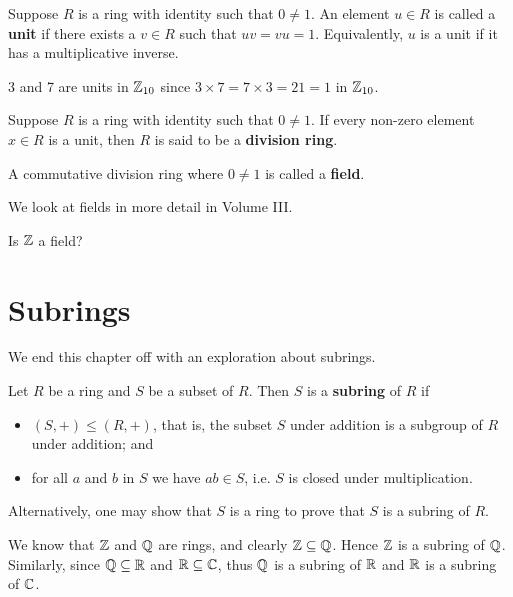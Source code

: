 \begin{definition}
    Suppose $R$ is a ring with identity such that $0 \neq 1$. An element $u \in R$ is called a \textbf{unit} if there exists a $v \in R$ such that $uv=vu=1$. Equivalently, $u$ is a unit if it has a multiplicative inverse.
\end{definition}
\begin{example}
    3 and 7 are units in $\mathbb{Z}_{10}$ since $3 \times 7 = 7 \times 3 = 21 = 1$ in $\mathbb{Z}_{10}$.
\end{example}

\begin{definition}
    Suppose $R$ is a ring with identity such that $0 \neq 1$. If every non-zero element $x \in R$ is a unit, then $R$ is said to be a \textbf{division ring}.
\end{definition}

\begin{definition}
    A commutative division ring where $0 \neq 1$ is called a \textbf{field}.
\end{definition}
We look at fields in more detail in Volume III.

\begin{exercise}\label{exercise-Z-is-not-a-field}
    Is $\mathbb{Z}$ a field?
\end{exercise}

\section{Subrings}
We end this chapter off with an exploration about subrings.

\begin{definition}
    Let $R$ be a ring and $S$ be a subset of $R$. Then $S$ is a \textbf{subring} of $R$ if
    \begin{itemize}
        \item $(S, +) \leq (R, +)$, that is, the subset $S$ under addition is a subgroup of $R$ under addition; and
        \item for all $a$ and $b$ in $S$ we have $ab \in S$, i.e. $S$ is closed under multiplication.
    \end{itemize}
\end{definition}
\begin{remark}
    Alternatively, one may show that $S$ is a ring to prove that $S$ is a subring of $R$.
\end{remark}

\begin{example}
    We know that $\mathbb{Z}$ and $\mathbb{Q}$ are rings, and clearly $\mathbb{Z} \subseteq \mathbb{Q}$. Hence $\mathbb{Z}$ is a subring of $\mathbb{Q}$. Similarly, since $\mathbb{Q} \subseteq \mathbb{R}$ and $\mathbb{R} \subseteq \mathbb{C}$, thus $\mathbb{Q}$ is a subring of $\mathbb{R}$ and $\mathbb{R}$ is a subring of $\mathbb{C}$.
\end{example}


